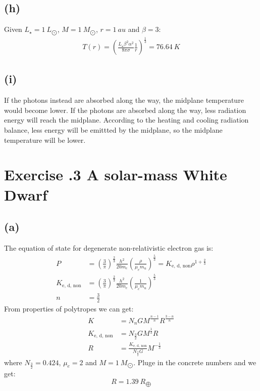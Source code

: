 \documentclass[a4paper,12pt]{article}
\begin{document}
\subsection*{(h)}
Given $L_\star = 1 \ L_{\bigodot}$, $M = 1 \ M_{\bigodot}$, $r = 1\ au$ and $\beta =3$:
\begin{align*}
    T(r) = (\frac{L_\star \beta^2 \alpha^2}{8\pi \sigma} \frac{1}{r})^{\frac{1}{3}}
    = 76.64 \ K
\end{align*}

\subsection*{(i)}
If the photons instead are absorbed along the way, 
the midplane temperature would become lower.
If the photons are absorbed along the way,
less radiation energy will reach the midplane. 
According to the heating and cooling radiation balance, 
less energy will be emittted by the midplane, so the 
midplane temperature will be lower.

\section*{\textbf{Exercise \uppercase\expandafter{}.3 A solar-mass White Dwarf}}
\subsection*{(a)}
The equation of state for degenerate non-relativistic electron gas is:
\begin{align*}
    P &= (\frac{3}{\pi})^{\frac{2}{3}} \frac{h^2}{20 m_e} (\frac{\rho}{\mu_e m_u})^{\frac{5}{3}} 
    = K_{\text{e, d, non}} \rho^{1 + \frac{2}{3}}\\
    K_{\text{e, d, non}} &= (\frac{3}{\pi})^{\frac{2}{3}} \frac{h^2}{20 m_e} (\frac{1}{\mu_e m_u})^{\frac{5}{3}} \\
    n &= \frac{3}{2} 
\end{align*}
From properties of polytropes we can get:
\begin{align*}
    K &= N_n G M^{\frac{n-1}{n}} R^{\frac{3-n}{n}} \\
    K_{\text{e, d, non}} &= N_{\frac{3}{2}} G M^{\frac{1}{3}} R \\
    R &= \frac{K_{\text{e, d, non}}}{N_{\frac{3}{2}} G} M^{-\frac{1}{3}}
\end{align*}
where $N_{\frac{3}{2}} = 0.424$, $\mu_e = 2$ and $M = 1 \ M_{\bigodot}$. Pluge in the 
concrete numbers and we get:
\begin{equation*}
    R = 1.39 \ R_{\bigoplus}
\end{equation*}
\end{document}
